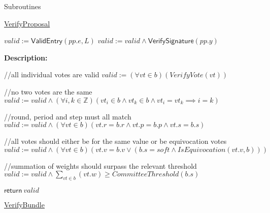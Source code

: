 \documentclass[10pt,a4paper]{article}
\begin{document}
\begin{section}{Subroutines}

\begin{algorithm}[H]
    \caption{\underline{VerifyProposal}}
    \label{algo:verify-proposal}
    \begin{algorithmic}[1]

    \State $valid := \mathsf{ValidEntry}(pp.e, L)$
    \State $valid := valid \land \mathsf{VerifySignature}(pp.y)$

    \EndFunction
    \end{algorithmic}
\end{algorithm}

\noindent \textbf{Description:}\\


\begin{algorithm}[H]\label{algo:verify-bundle}
    \begin{algorithmic}[1]

    //all individual votes are valid
    \State $valid := (\forall vt \in b)(VerifyVote(vt))$
    
    //no two votes are the same
    \State $valid := valid \land (\forall i,k \in \mathbb{Z})(vt_i \in b \land vt_k \in b \land vt_i = vt_k \implies i=k)$

    //round, period and step must all match
    \State $valid := valid \land (\forall vt \in b)(vt.r = b.r \land vt.p = b.p \land vt.s = b.s)$
  
    //all votes should either be for the same value or be equivocation votes
    \State $valid := valid \land (\forall vt \in b)(vt.v = b.v \lor (b.s = soft \land IsEquivocation(vt.v, b)))$

    //summation of weights should surpass the relevant threshold
    \State $valid := valid \land  \sum_{vt \in b}(vt.w) \geq CommitteeThreshold(b.s)$

    \State $\mathsf{return} \ valid$

    \EndFunction
    \end{algorithmic}
    \caption{\underline{VerifyBundle}}
\end{algorithm}


\end{section}
\end{document}
